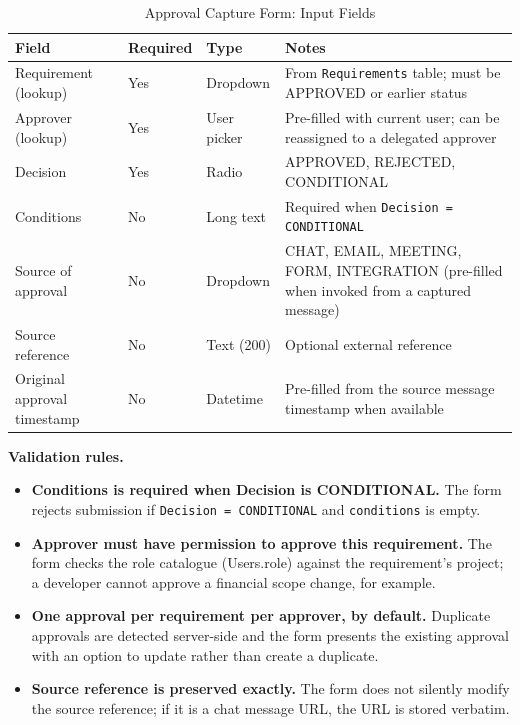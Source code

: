 \documentclass[12pt,a4paper]{report}
\begin{document}
\begin{table}[H]
\centering
\caption{Approval Capture Form: Input Fields}
\small
\renewcommand{\arraystretch}{1.30}
\setlength{\tabcolsep}{6pt}
\begin{tabularx}{\textwidth}{>{\raggedright\arraybackslash}p{3.6cm}
                                >{\raggedright\arraybackslash}p{1.6cm}
                                >{\raggedright\arraybackslash}p{2.4cm}
                                >{\raggedright\arraybackslash}X}
\toprule
\textbf{Field} & \textbf{Required} & \textbf{Type} & \textbf{Notes} \\
\midrule
Requirement (lookup)       & Yes & Dropdown    & From \texttt{Requirements} table; must be APPROVED or earlier status \\
Approver (lookup)           & Yes & User picker & Pre-filled with current user; can be reassigned to a delegated approver \\
Decision                   & Yes & Radio       & APPROVED, REJECTED, CONDITIONAL \\
Conditions                 & No  & Long text   & Required when \texttt{Decision = CONDITIONAL} \\
Source of approval         & No  & Dropdown    & CHAT, EMAIL, MEETING, FORM, INTEGRATION (pre-filled when invoked from a captured message) \\
Source reference            & No  & Text (200)  & Optional external reference \\
Original approval timestamp & No  & Datetime    & Pre-filled from the source message timestamp when available \\
\bottomrule
\end{tabularx}
\end{table}

\textbf{Validation rules.}
\begin{itemize}[leftmargin=1.6em]
    \item \textbf{Conditions is required when Decision is CONDITIONAL.} The
          form rejects submission if \texttt{Decision = CONDITIONAL} and
          \texttt{conditions} is empty.
    \item \textbf{Approver must have permission to approve this requirement.}
          The form checks the role catalogue (Users.role) against the
          requirement's project; a developer cannot approve a financial
          scope change, for example.
    \item \textbf{One approval per requirement per approver, by default.}
          Duplicate approvals are detected server-side and the form presents
          the existing approval with an option to update rather than create a
          duplicate.
    \item \textbf{Source reference is preserved exactly.} The form does not
          silently modify the source reference; if it is a chat message
          URL, the URL is stored verbatim.
\end{itemize}
\end{document}
